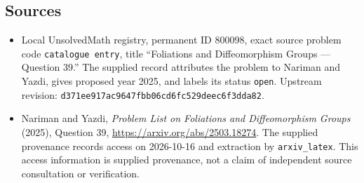 \documentclass[11pt]{article}
\begin{document}
\subsection{Sources}
\begin{itemize}
\item Local UnsolvedMath registry, permanent ID \(800098\), exact source problem code \texttt{catalogue entry}, title ``Foliations and Diffeomorphism Groups --- Question 39.'' The supplied record attributes the problem to Nariman and Yazdi, gives proposed year 2025, and labels its status \texttt{open}. Upstream revision: \texttt{d371ee917ac9647fbb06cd6fc529deec6f3dda82}.
\item Nariman and Yazdi, \emph{Problem List on Foliations and Diffeomorphism Groups} (2025), Question 39, \url{https://arxiv.org/abs/2503.18274}. The supplied provenance records access on 2026-10-16 and extraction by \texttt{arxiv\_latex}. This access information is supplied provenance, not a claim of independent source consultation or verification.
\end{itemize}
\end{document}
